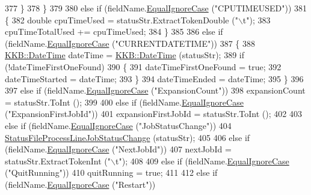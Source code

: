 \begin{DoxyCode}
377     \}
378   \}
379 
380   \textcolor{keywordflow}{else} \textcolor{keywordflow}{if}  (fieldName.\hyperlink{class_k_k_b_1_1_k_k_str_a562f9696417c53f66bc4088eac072ab5}{EqualIgnoreCase} (\textcolor{stringliteral}{"CPUTIMEUSED"}))
381   \{
382     \textcolor{keywordtype}{double}  cpuTimeUsed = statusStr.ExtractTokenDouble (\textcolor{stringliteral}{"\(\backslash\)t"});
383     cpuTimeTotalUsed += cpuTimeUsed;
384   \}
385 
386   \textcolor{keywordflow}{else} \textcolor{keywordflow}{if}  (fieldName.\hyperlink{class_k_k_b_1_1_k_k_str_a562f9696417c53f66bc4088eac072ab5}{EqualIgnoreCase} (\textcolor{stringliteral}{"CURRENTDATETIME"}))
387   \{
388     \hyperlink{class_k_k_b_1_1_date_time}{KKB::DateTime}  dateTime = \hyperlink{class_k_k_b_1_1_date_time}{KKB::DateTime} (statusStr);
389     \textcolor{keywordflow}{if}  (!dateTimeFirstOneFound)
390     \{
391       dateTimeFirstOneFound = \textcolor{keyword}{true};
392       dateTimeStarted = dateTime;
393     \}
394     dateTimeEnded = dateTime;
395   \}
396 
397   \textcolor{keywordflow}{else} \textcolor{keywordflow}{if}  (fieldName.\hyperlink{class_k_k_b_1_1_k_k_str_a562f9696417c53f66bc4088eac072ab5}{EqualIgnoreCase} (\textcolor{stringliteral}{"ExpansionCount"}))
398     expansionCount = statusStr.ToInt ();
399 
400   \textcolor{keywordflow}{else} \textcolor{keywordflow}{if}  (fieldName.\hyperlink{class_k_k_b_1_1_k_k_str_a562f9696417c53f66bc4088eac072ab5}{EqualIgnoreCase} (\textcolor{stringliteral}{"ExpansionFirstJobId"}))
401     expansionFirstJobId = statusStr.ToInt ();
402 
403   \textcolor{keywordflow}{else} \textcolor{keywordflow}{if}  (fieldName.\hyperlink{class_k_k_b_1_1_k_k_str_a562f9696417c53f66bc4088eac072ab5}{EqualIgnoreCase} (\textcolor{stringliteral}{"JobStatusChange"}))
404     \hyperlink{class_k_k_job_managment_1_1_k_k_job_manager_a8af4586408c5cedba947acc3658294e1}{StatusFileProcessLineJobStatusChange} (statusStr);
405 
406   \textcolor{keywordflow}{else} \textcolor{keywordflow}{if}  (fieldName.\hyperlink{class_k_k_b_1_1_k_k_str_a562f9696417c53f66bc4088eac072ab5}{EqualIgnoreCase} (\textcolor{stringliteral}{"NextJobId"}))
407     nextJobId = statusStr.ExtractTokenInt (\textcolor{stringliteral}{"\(\backslash\)t"});
408 
409   \textcolor{keywordflow}{else} \textcolor{keywordflow}{if}  (fieldName.\hyperlink{class_k_k_b_1_1_k_k_str_a562f9696417c53f66bc4088eac072ab5}{EqualIgnoreCase} (\textcolor{stringliteral}{"QuitRunning"}))
410     quitRunning = \textcolor{keyword}{true};
411 
412   \textcolor{keywordflow}{else} \textcolor{keywordflow}{if}  (fieldName.\hyperlink{class_k_k_b_1_1_k_k_str_a562f9696417c53f66bc4088eac072ab5}{EqualIgnoreCase} (\textcolor{stringliteral}{"Restart"}))

\end{DoxyCode}

